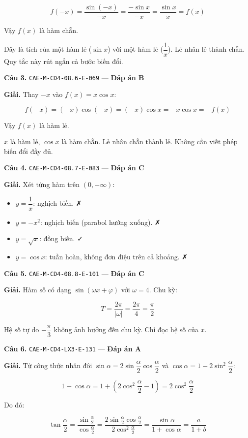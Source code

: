 \documentclass[11pt, a4paper]{article}
\begin{document}
$$f(-x) = \frac{\sin(-x)}{-x} = \frac{-\sin x}{-x} = \frac{\sin x}{x} = f(x)$$

Vậy $f(x)$ là hàm chẵn.

 Đây là tích của một hàm lẻ ($\sin x$) với một hàm lẻ ($\dfrac{1}{x}$). Lẻ nhân lẻ thành chẵn. Quy tắc này rút ngắn cả bước biến đổi.

\textbf{Câu 3.} \texttt{CAE-M-CD4-08.6-E-069} — \textbf{Đáp án B}

\textbf{Giải.} Thay $-x$ vào $f(x) = x\cos x$:

$$f(-x) = (-x)\cos(-x) = (-x)\cos x = -x\cos x = -f(x)$$

Vậy $f(x)$ là hàm lẻ.

 $x$ là hàm lẻ, $\cos x$ là hàm chẵn. Lẻ nhân chẵn thành lẻ. Không cần viết phép biến đổi đầy đủ.

\textbf{Câu 4.} \texttt{CAE-M-CD4-08.7-E-083} — \textbf{Đáp án C}

\textbf{Giải.} Xét từng hàm trên $(0, +\infty)$:

\begin{itemize}[leftmargin=1.4em, itemsep=2pt]
\item $y = \dfrac{1}{x}$: nghịch biến. ✗
\item $y = -x^2$: nghịch biến (parabol hướng xuống). ✗
\item $y = \sqrt{x}$: đồng biến. ✓
\item $y = \cos x$: tuần hoàn, không đơn điệu trên cả khoảng. ✗
\end{itemize}

\textbf{Câu 5.} \texttt{CAE-M-CD4-08.8-E-101} — \textbf{Đáp án C}

\textbf{Giải.} Hàm số có dạng $\sin(\omega x + \varphi)$ với $\omega = 4$. Chu kỳ:

$$T = \frac{2\pi}{|\omega|} = \frac{2\pi}{4} = \frac{\pi}{2}$$

 Hệ số tự do $-\dfrac{\pi}{3}$ không ảnh hưởng đến chu kỳ. Chỉ đọc hệ số của $x$.

\textbf{Câu 6.} \texttt{CAE-M-CD4-LX3-E-131} — \textbf{Đáp án A}

\textbf{Giải.} Từ công thức nhân đôi $\sin\alpha = 2\sin\dfrac{\alpha}{2}\cos\dfrac{\alpha}{2}$ và $\cos\alpha = 1 - 2\sin^2\dfrac{\alpha}{2}$:

$$1 + \cos\alpha = 1 + \left(2\cos^2\frac{\alpha}{2} - 1\right) = 2\cos^2\frac{\alpha}{2}$$

Do đó:

$$\tan\frac{\alpha}{2} = \frac{\sin\frac{\alpha}{2}}{\cos\frac{\alpha}{2}} = \frac{2\sin\frac{\alpha}{2}\cos\frac{\alpha}{2}}{2\cos^2\frac{\alpha}{2}} = \frac{\sin\alpha}{1 + \cos\alpha} = \frac{a}{1+b}$$
\end{document}
